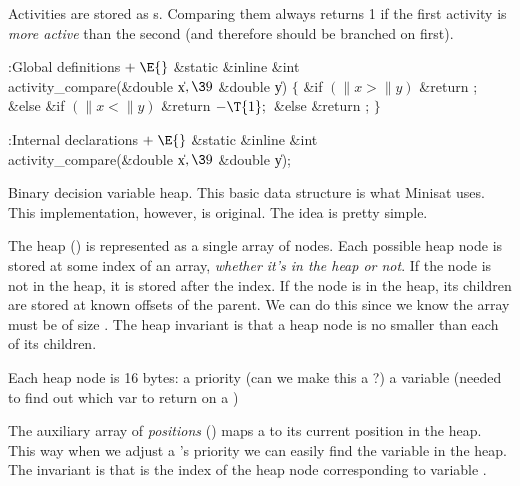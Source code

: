 Activities are stored as s. Comparing them always returns
1 if the
first activity is {\it more active} than the second (and therefore should be
branched on first).

\Y\B\4:Global definitions\X${}\mathrel+\E{}$\6
\&{static} \&{inline} \&{int} \\{activity\_compare}(\&{double} \|x${},\39{}$%
\&{double} \|y)\1\1\2\2\6
${}\{{}$\1\6
\&{if} ${}(\|x>\|y){}$\1\5
\&{return} ;\2\6
\&{else} \&{if} ${}(\|x<\|y){}$\1\5
\&{return} ${}{-}\T{1};{}$\2\6
\&{else}\1\5
\&{return} ;\2\6
\4${}\}{}$\2\par
\fi

\Y\B\4:Internal declarations\X${}\mathrel+\E{}$\6
\&{static} \&{inline} \&{int} \\{activity\_compare}(\&{double} \|x${},\39{}$%
\&{double} \|y);\par
\fi

Binary decision variable heap. This basic data structure is what
Minisat
uses. This implementation, however, is original. The idea is pretty simple.

The heap () is represented as a single array of
nodes. Each
possible heap node is stored at some index of an array, {\it whether it's in
the
heap or not}. If the node is not in the heap, it is stored after the
 index. If the node is in the heap, its
children are stored
at known offsets of the parent. We can do this since we know the array must be
of size . The heap invariant is that a heap node is no
smaller than
each of its children.

Each heap node is 16 bytes:
\numberedlist
\li a  priority (can we make this a ?)
\li a  variable (needed to find out which var to return on a %
)
\endnumberedlist

The auxiliary array of {\it positions} () maps a %
 to
its current position in the heap. This way when we adjust a 's
priority we can easily find the variable in the heap.  The 
invariant is that  is the index of the heap
node corresponding
to variable .

